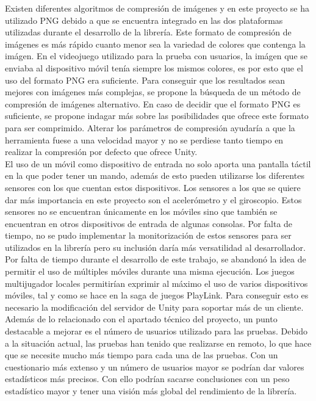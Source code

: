 Existen diferentes algoritmos de compresi\'on de im\'agenes y en este proyecto se ha utilizado PNG debido a que se encuentra integrado en las dos plataformas utilizadas durante el desarrollo de la librer\'ia. Este formato de compresi\'on de im\'agenes es m\'as r\'apido cuanto menor sea la variedad de colores que contenga la im\'agen. En el videojuego utilizado para la prueba con usuarios, la im\'agen que se enviaba al dispositivo m\'ovil ten\'ia siempre los mismos colores, es por esto que el uso del formato PNG era suficiente. Para conseguir que los resultados sean mejores con im\'agenes m\'as complejas, se propone la b\'usqueda de un m\'etodo de compresi\'on de im\'agenes alternativo. En caso de decidir que el formato PNG es suficiente, se propone indagar m\'as sobre las posibilidades que ofrece este formato para ser comprimido. Alterar los par\'ametros de compresi\'on ayudar\'ia a que la herramienta fuese a una velocidad mayor y no se perdiese tanto tiempo en realizar la compresi\'on por defecto que ofrece Unity.\\

El uso de un m\'ovil como dispositivo de entrada no solo aporta una pantalla t\'actil en la que poder tener un mando, adem\'as de esto pueden utilizarse los diferentes sensores con los que cuentan estos dispositivos. Los sensores a los que se quiere dar m\'as importancia en este proyecto son el aceler\'ometro y el giroscopio. Estos sensores no se encuentran \'unicamente en los m\'oviles sino que tambi\'en se encuentran en otros dispositivos de entrada de algunas consolas. Por falta de tiempo, no se pudo implementar la monitorizaci\'on de estos sensores para ser utilizados en la librer\'ia pero su inclusi\'on dar\'ia m\'as versatilidad al desarrollador.\\

Por falta de tiempo durante el desarrollo de este trabajo, se abandon\'o la idea de permitir el uso de m\'ultiples m\'oviles durante una misma ejecuci\'on. Los juegos multijugador locales permitir\'ian exprimir al m\'aximo el uso de varios dispositivos m\'oviles, tal y como se hace en la saga de juegos PlayLink. Para conseguir esto es necesario la modificaci\'on del servidor de Unity para soportar m\'as de un cliente. \\

Adem\'as de lo relacionado con el apartado t\'ecnico del proyecto, un punto destacable a mejorar es el n\'umero de usuarios utilizado para las pruebas. Debido a la situaci\'on actual, las pruebas han tenido que realizarse en remoto, lo que hace que se necesite mucho m\'as tiempo para cada una de las pruebas. Con un cuestionario m\'as extenso y un n\'umero de usuarios mayor se podr\'ian dar valores estad\'isticos m\'as precisos. Con ello podr\'ian sacarse conclusiones con un peso estad\'istico mayor y tener una visi\'on m\'as global del rendimiento de la librer\'ia.


